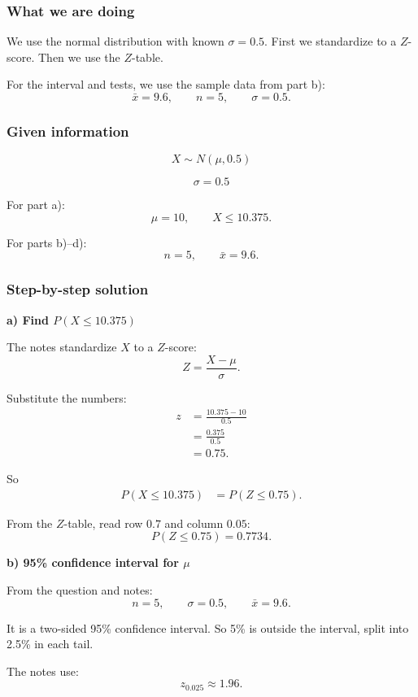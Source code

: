\documentclass[10pt]{article}
\begin{document}
\subsubsection*{What we are doing}

We use the normal distribution with known
\(\sigma=0.5\). First we standardize to a
\(Z\)-score. Then we use the \(Z\)-table.

For the interval and tests, we use the sample data
from part b):
\[
\bar{x}=9.6,\qquad n=5,\qquad \sigma=0.5.
\]

\subsubsection*{Given information}

\[
X \sim N(\mu,0.5)
\]

\[
\sigma = 0.5
\]

For part a):
\[
\mu = 10,
\qquad
X \le 10.375.
\]

For parts b)--d):
\[
n=5,
\qquad
\bar{x}=9.6.
\]

\subsubsection*{Step-by-step solution}

\textbf{a) Find \(P(X \le 10.375)\)}

The notes standardize \(X\) to a \(Z\)-score:
\[
Z=\frac{X-\mu}{\sigma}.
\]

Substitute the numbers:
\begin{align*}
z
&=
\frac{10.375-10}{0.5}
\\[2mm]
&=
\frac{0.375}{0.5}
\\[2mm]
&=0.75.
\end{align*}

So
\begin{align*}
P(X \le 10.375)
&=
P(Z \le 0.75).
\end{align*}

From the \(Z\)-table, read row \(0.7\) and
column \(0.05\):
\[
P(Z \le 0.75)=0.7734.
\]

\textbf{b) 95\% confidence interval for \(\mu\)}

From the question and notes:
\[
n=5,\qquad \sigma=0.5,\qquad \bar{x}=9.6.
\]

It is a two-sided 95\% confidence interval.
So 5\% is outside the interval, split into
2.5\% in each tail.

The notes use:
\[
z_{0.025}\approx 1.96.
\]
\end{document}
